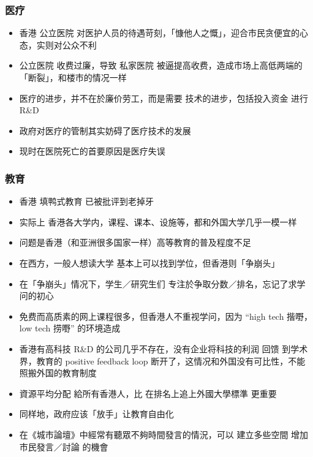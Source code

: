 \documentclass[10pt]{beamer}
\newcommand{\emp}[1]{{\color{blue}#1}}
\newif\ifframeinlbf
\begin{document}
\frameinlbftrue
\begin{frame}
\frametitle{医疗}
\begin{itemize}
	\item 香港 公立医院 对医护人员的待遇苛刻，「慷他人之慨」，迎合市民贪便宜的心态，实则对公众不利
	
	\item 公立医院 收费过廉，导致 私家医院 被逼提高收费，造成市场上高低两端的「断裂」，和楼市的情况一样
	
	\item 医疗的进步，并不在於廉价劳工，而是需要 技术的进步，包括投入资金 进行 R\&D
	
	\item 政府对医疗的管制其实妨碍了医疗技术的发展
	
	\item 现时在医院死亡的首要原因是医疗失误
\end{itemize}
\end{frame}

\begin{frame}
\frametitle{教育}
\begin{itemize}
	\item 香港 填鸭式教育 已被批评到老掉牙
	
	\item 实际上 香港各大学内，课程、课本、设施等，都和外国大学几乎一模一样
	
	\item 问题是香港（和亚洲很多国家一样）高等教育的普及程度不足
	
	\item 在西方，一般人想读大学 基本上可以找到学位，但香港则「争崩头」 
	
	\item 在「争崩头」情况下，学生／研究生们 专注於争取分数／排名，忘记了求学问的初心 
	
	\item 免费而高质素的网上课程很多，但香港人不重视学问，因为 ``high tech 揩嘢，low tech 捞嘢'' 的环境造成
	
	\item 香港有高科技 R\&D 的公司几乎不存在，没有企业将科技的利润 \emp{回馈} 到学术界，教育的 positive feedback loop 断开了，这情况和外国没有可比性，不能照搬外国的教育制度
	
	\item 資源平均分配 給所有香港人，比 在排名上追上外國大學標準 更重要
	
	\item 同样地，政府应该「放手」让教育自由化
	
	\item 在《城市論壇》中經常有聽眾不夠時間發言的情況，可以 建立多些空間 增加市民發言／討論 的機會
\end{itemize}
\end{frame}
\end{document}
